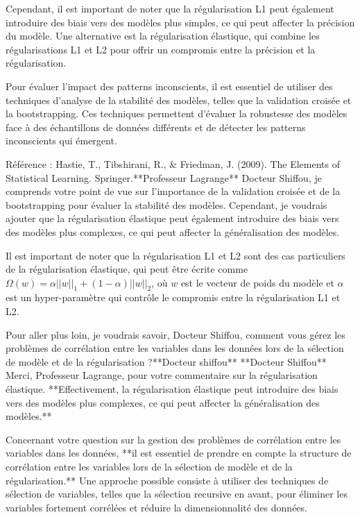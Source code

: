 Cependant, il est important de noter que la régularisation L1 peut également introduire des biais vers des modèles plus simples, ce qui peut affecter la précision du modèle. Une alternative est la régularisation élastique, qui combine les régularisations L1 et L2 pour offrir un compromis entre la précision et la régularisation.

Pour évaluer l'impact des patterns inconscients, il est essentiel de utiliser des techniques d'analyse de la stabilité des modèles, telles que la validation croisée et la bootstrapping. Ces techniques permettent d'évaluer la robustesse des modèles face à des échantillons de données différents et de détecter les patterns inconscients qui émergent.

Référence : Hastie, T., Tibshirani, R., & Friedman, J. (2009). The Elements of Statistical Learning. Springer.**Professeur Lagrange**
Docteur Shiffou, je comprends votre point de vue sur l'importance de la validation croisée et de la bootstrapping pour évaluer la stabilité des modèles. Cependant, je voudrais ajouter que la régularisation élastique peut également introduire des biais vers des modèles plus complexes, ce qui peut affecter la généralisation des modèles.

Il est important de noter que la régularisation L1 et L2 sont des cas particuliers de la régularisation élastique, qui peut être écrite comme $\Omega(w) = \alpha ||w||_1 + (1-\alpha) ||w||_2$, où $w$ est le vecteur de poids du modèle et $\alpha$ est un hyper-paramètre qui contrôle le compromis entre la régularisation L1 et L2.

Pour aller plus loin, je voudrais savoir, Docteur Shiffou, comment vous gérez les problèmes de corrélation entre les variables dans les données lors de la sélection de modèle et de la régularisation ?**Docteur shiffou**
**Docteur Shiffou**
Merci, Professeur Lagrange, pour votre commentaire sur la régularisation élastique. **Effectivement, la régularisation élastique peut introduire des biais vers des modèles plus complexes, ce qui peut affecter la généralisation des modèles.**

Concernant votre question sur la gestion des problèmes de corrélation entre les variables dans les données, **il est essentiel de prendre en compte la structure de corrélation entre les variables lors de la sélection de modèle et de la régularisation.** Une approche possible consiste à utiliser des techniques de sélection de variables, telles que la sélection recursive en avant, pour éliminer les variables fortement corrélées et réduire la dimensionnalité des données.

